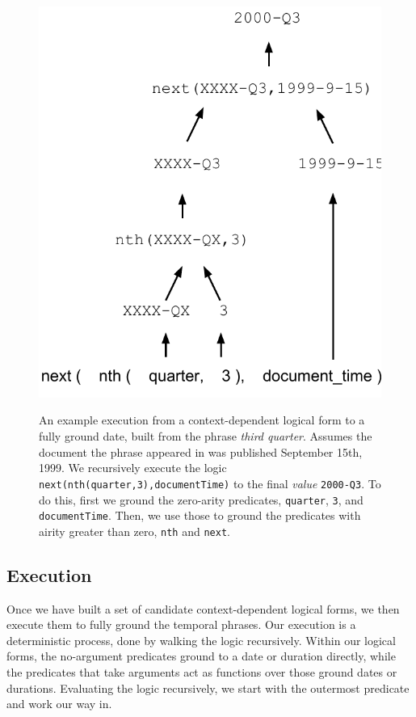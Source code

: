 \begin{figure}[t!]
   \center
   {\includegraphics[width=.85\columnwidth]{fig/executionExample.pdf}}
   \caption{An example execution from a context-dependent logical form to a fully ground date, built from the phrase \emph{third quarter}. Assumes the document the phrase appeared in was published September 15th, 1999. We recursively execute the logic \texttt{next(nth(quarter,3),documentTime)} to the final \emph{value} \texttt{2000-Q3}. To do this, first we ground the zero-arity predicates, \texttt{quarter}, \texttt{3}, and \texttt{documentTime}. Then, we use those to ground the predicates with airity greater than zero, \texttt{nth} and \texttt{next}.
   } 
   \label{fig:executionExample}
\end{figure}

\subsection{Execution}
Once we have built a set of candidate context-dependent logical forms, we then execute them to fully ground the temporal phrases. Our execution is a deterministic process, done by walking the logic recursively. Within our logical forms, the no-argument predicates ground to a date or duration directly, while the predicates that take arguments act as functions over those ground dates or durations. Evaluating the logic recursively, we start with the outermost predicate and work our way in. 

















